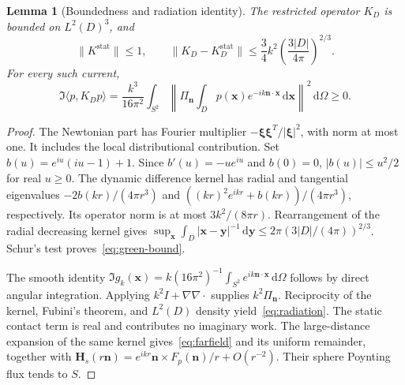 \documentclass[11pt]{article}
\newtheorem{lemma}[theorem]{Lemma}
\newcommand{\dd}{\,\mathrm{d}}
\newcommand{\ip}[2]{\langle #1,#2\rangle}
\newcommand{\norm}[1]{\lVert #1\rVert}
\newcommand{\abs}[1]{\lvert #1\rvert}
\begin{document}
\begin{lemma}[Boundedness and radiation identity]\label{lem:green}
The restricted operator $K_D$ is bounded on $L^2(D)^3$, and
\begin{equation}\label{eq:green-bound}
 \norm{K^{\mathrm{stat}}}\leq1,\qquad
 \norm{K_D-K^{\mathrm{stat}}_D}\leq\frac34 k^2
 \left(\frac{3\abs{D}}{4\pi}\right)^{2/3}.
\end{equation}
For every such current,
\begin{equation}\label{eq:radiation}
 \Im\ip{p}{K_Dp}
 =\frac{k^3}{16\pi^2}\int_{S^2}
 \left\lVert\Pi_{\mathbf n}\int_Dp(\mathbf x)e^{-ik\mathbf n\cdot\mathbf x}\dd\mathbf x\right\rVert^2\dd\Omega
 \geq0.
\end{equation}
\end{lemma}
\begin{proof}
The Newtonian part has Fourier multiplier $-\boldsymbol\xi\boldsymbol\xi^T/\abs{\boldsymbol\xi}^2$, with norm at most one. It includes the local distributional contribution. Set $b(u)=e^{iu}(iu-1)+1$. Since $b'(u)=-ue^{iu}$ and $b(0)=0$, $\abs{b(u)}\leq u^2/2$ for real $u\geq0$. The dynamic difference kernel has radial and tangential eigenvalues $-2b(kr)/(4\pi r^3)$ and $((kr)^2e^{ikr}+b(kr))/(4\pi r^3)$, respectively. Its operator norm is at most $3k^2/(8\pi r)$. Rearrangement of the radial decreasing kernel gives $\sup_{\mathbf x}\int_D\abs{\mathbf x-\mathbf y}^{-1}\dd\mathbf y\leq2\pi(3\abs{D}/(4\pi))^{2/3}$. Schur's test proves~\eqref{eq:green-bound}.

The smooth identity $\Im g_k(\mathbf x)=k(16\pi^2)^{-1}\int_{S^2}e^{ik\mathbf n\cdot\mathbf x}\dd\Omega$ follows by direct angular integration. Applying $k^2I+\nabla\nabla\cdot$ supplies $k^2\Pi_{\mathbf n}$. Reciprocity of the kernel, Fubini's theorem, and $L^2(D)$ density yield~\eqref{eq:radiation}. The static contact term is real and contributes no imaginary work. The large-distance expansion of the same kernel gives~\eqref{eq:farfield} and its uniform remainder, together with $\mathbf H_s(r\mathbf n)=e^{ikr}\mathbf n\times F_p(\mathbf n)/r+O(r^{-2})$. Their sphere Poynting flux tends to $S$.
\end{proof}
\end{document}
